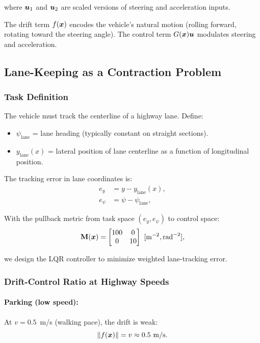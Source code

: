 where $\bm{u}_1$ and $\bm{u}_2$ are scaled versions of steering and acceleration inputs.

The drift term $f(\bm{x})$ encodes the vehicle's natural motion (rolling forward, rotating
toward the steering angle). The control term $G(\bm{x})\bm{u}$ modulates steering and acceleration.

\subsection{Lane-Keeping as a Contraction Problem}

\subsubsection{Task Definition}

The vehicle must track the centerline of a highway lane. Define:
\begin{itemize}
\item $\psi_{\text{lane}}$ = lane heading (typically constant on straight sections).
\item $y_{\text{lane}}(x)$ = lateral position of lane centerline as a function of
longitudinal position.
\end{itemize}

The tracking error in lane coordinates is:
\begin{align}
e_y &= y - y_{\text{lane}}(x), \label{eq:ch8:error-lateral} \\
e_\psi &= \psi - \psi_{\text{lane}}, \label{eq:ch8:error-heading}
\end{align}

With the pullback metric from task space $(e_y, e_\psi)$ to control space:
\begin{equation}
\mathbf{M}(\bm{x}) = \begin{bmatrix}
100 & 0 \\
0 & 10
\end{bmatrix}~[\text{m}^{-2}, \text{rad}^{-2}],
\label{eq:ch8:M-lane}
\end{equation}

we design the LQR controller to minimize weighted lane-tracking error.

\subsubsection{Drift-Control Ratio at Highway Speeds}

\paragraph{Parking (low speed):}
At $v = 0.5$~m/s (walking pace), the drift is weak:
\begin{equation}
\|f(\bm{x})\| = v \approx 0.5~\text{m/s}.
\end{equation}

